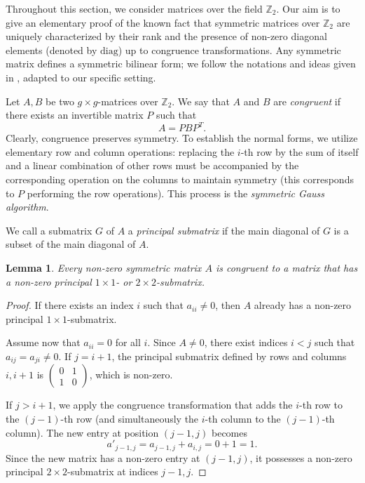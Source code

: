 \documentclass[11pt,a4paper]{article}
\newtheorem{lemma}[theorem]{Lemma}
\theoremstyle{definition}
\begin{document}
Throughout this section, we consider matrices over the field $\mathds{Z}_2$.
Our aim is to give an elementary proof of the known fact that symmetric matrices over $\mathds{Z}_2$ are uniquely characterized by their rank and the presence of non-zero diagonal elements (denoted by $\mathrm{diag}$) up to congruence transformations.
Any symmetric matrix defines a symmetric bilinear form; we follow the notations and ideas given in \cite{Alb38}, adapted to our specific setting.

Let $A, B$ be two $g \times g$-matrices over $\mathds{Z}_2$.
We say that $A$ and $B$ are \emph{congruent} if there exists an invertible matrix $P$ such that
\[
A = P B P^{T}.
\]
Clearly, congruence preserves symmetry.
To establish the normal forms, we utilize elementary row and column operations: replacing the $i$-th row by the sum of itself and a linear combination of other rows must be accompanied by the corresponding operation on the columns to maintain symmetry (this corresponds to $P$ performing the row operations). This process is the \emph{symmetric Gauss algorithm}.

We call a submatrix $G$ of $A$ a \emph{principal submatrix} if the main diagonal of $G$ is a subset of the main diagonal of $A$.

\begin{lemma}\label{lem:congruence}
	Every non-zero symmetric matrix $A$ is congruent to a matrix that has a non-zero principal $1\times1$- or $2\times2$-submatrix.
\end{lemma}

\begin{proof}
	If there exists an index $i$ such that $a_{ii} \neq 0$, then $A$ already has a non-zero principal $1\times1$-submatrix.
	
	Assume now that $a_{ii} = 0$ for all $i$. Since $A \neq 0$, there exist indices $i < j$ such that $a_{ij} = a_{ji} \neq 0$.
	If $j = i + 1$, the principal submatrix defined by rows and columns $i, i+1$ is $\begin{pmatrix} 0 & 1 \\ 1 & 0 \end{pmatrix}$, which is non-zero.
	
	If $j > i + 1$, we apply the congruence transformation that adds the $i$-th row to the $(j-1)$-th row (and simultaneously the $i$-th column to the $(j-1)$-th column).
	The new entry at position $(j-1, j)$ becomes
	\[
	a'_{j-1, j} = a_{j-1, j} + a_{i, j} = 0 + 1 = 1.
	\]
	Since the new matrix has a non-zero entry at $(j-1, j)$, it possesses a non-zero principal $2\times2$-submatrix at indices $j-1, j$.
\end{proof}
\end{document}
